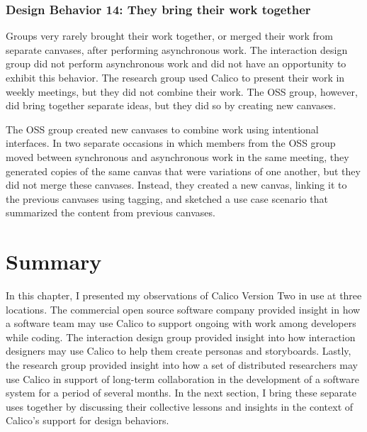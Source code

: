 \subsubsection{Design Behavior 14: They bring their work together}

Groups very rarely brought their work together, or merged their work from separate canvases, after performing asynchronous work. The interaction design group did not perform asynchronous work and did not have an opportunity to exhibit this behavior. The research group used Calico to present their work in weekly meetings, but they did not combine their work. The OSS group, however, did bring together separate ideas, but they did so by creating new canvases. 

The OSS group created new canvases to combine work using intentional interfaces. In two separate occasions in which members from the OSS group moved between synchronous and asynchronous work in the same meeting, they generated copies of the same canvas that were variations of one another, but they did not merge these canvases. Instead, they created a new canvas, linking it to the previous canvases using tagging, and sketched a use case scenario that summarized the content from previous canvases. 


\section{Summary}
\label{chapter:evaluation:summary}

In this chapter, I presented my observations of Calico Version Two in use at three locations. The commercial open source software company provided insight in how a software team may use Calico to support ongoing with work among developers while coding. The interaction design group provided insight into how interaction designers may use Calico to help them create personas and storyboards. Lastly, the research group provided insight into how a set of distributed researchers may use Calico in support of long-term collaboration in the development of a software system for a period of several months. In the next section, I bring these separate uses together by discussing their collective lessons and insights in the context of Calico's support for design behaviors.

